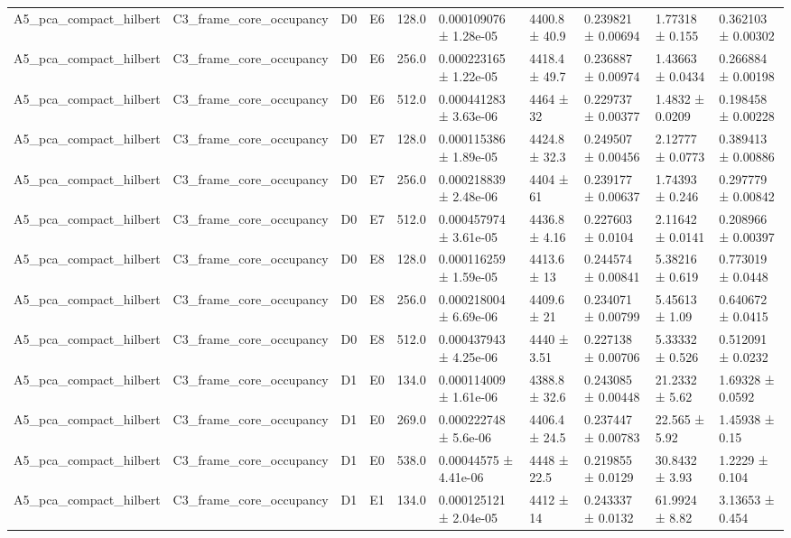 \begin{table}
\begin{tabular}{llllllllll}
A5\_pca\_compact\_hilbert & C3\_frame\_core\_occupancy & D0 & E6 & 128.0 & 0.000109076 ± 1.28e-05 & 4400.8 ± 40.9 & 0.239821 ± 0.00694 & 1.77318 ± 0.155 & 0.362103 ± 0.00302 \\
A5\_pca\_compact\_hilbert & C3\_frame\_core\_occupancy & D0 & E6 & 256.0 & 0.000223165 ± 1.22e-05 & 4418.4 ± 49.7 & 0.236887 ± 0.00974 & 1.43663 ± 0.0434 & 0.266884 ± 0.00198 \\
A5\_pca\_compact\_hilbert & C3\_frame\_core\_occupancy & D0 & E6 & 512.0 & 0.000441283 ± 3.63e-06 & 4464 ± 32 & 0.229737 ± 0.00377 & 1.4832 ± 0.0209 & 0.198458 ± 0.00228 \\
A5\_pca\_compact\_hilbert & C3\_frame\_core\_occupancy & D0 & E7 & 128.0 & 0.000115386 ± 1.89e-05 & 4424.8 ± 32.3 & 0.249507 ± 0.00456 & 2.12777 ± 0.0773 & 0.389413 ± 0.00886 \\
A5\_pca\_compact\_hilbert & C3\_frame\_core\_occupancy & D0 & E7 & 256.0 & 0.000218839 ± 2.48e-06 & 4404 ± 61 & 0.239177 ± 0.00637 & 1.74393 ± 0.246 & 0.297779 ± 0.00842 \\
A5\_pca\_compact\_hilbert & C3\_frame\_core\_occupancy & D0 & E7 & 512.0 & 0.000457974 ± 3.61e-05 & 4436.8 ± 4.16 & 0.227603 ± 0.0104 & 2.11642 ± 0.0141 & 0.208966 ± 0.00397 \\
A5\_pca\_compact\_hilbert & C3\_frame\_core\_occupancy & D0 & E8 & 128.0 & 0.000116259 ± 1.59e-05 & 4413.6 ± 13 & 0.244574 ± 0.00841 & 5.38216 ± 0.619 & 0.773019 ± 0.0448 \\
A5\_pca\_compact\_hilbert & C3\_frame\_core\_occupancy & D0 & E8 & 256.0 & 0.000218004 ± 6.69e-06 & 4409.6 ± 21 & 0.234071 ± 0.00799 & 5.45613 ± 1.09 & 0.640672 ± 0.0415 \\
A5\_pca\_compact\_hilbert & C3\_frame\_core\_occupancy & D0 & E8 & 512.0 & 0.000437943 ± 4.25e-06 & 4440 ± 3.51 & 0.227138 ± 0.00706 & 5.33332 ± 0.526 & 0.512091 ± 0.0232 \\
A5\_pca\_compact\_hilbert & C3\_frame\_core\_occupancy & D1 & E0 & 134.0 & 0.000114009 ± 1.61e-06 & 4388.8 ± 32.6 & 0.243085 ± 0.00448 & 21.2332 ± 5.62 & 1.69328 ± 0.0592 \\
A5\_pca\_compact\_hilbert & C3\_frame\_core\_occupancy & D1 & E0 & 269.0 & 0.000222748 ± 5.6e-06 & 4406.4 ± 24.5 & 0.237447 ± 0.00783 & 22.565 ± 5.92 & 1.45938 ± 0.15 \\
A5\_pca\_compact\_hilbert & C3\_frame\_core\_occupancy & D1 & E0 & 538.0 & 0.00044575 ± 4.41e-06 & 4448 ± 22.5 & 0.219855 ± 0.0129 & 30.8432 ± 3.93 & 1.2229 ± 0.104 \\
A5\_pca\_compact\_hilbert & C3\_frame\_core\_occupancy & D1 & E1 & 134.0 & 0.000125121 ± 2.04e-05 & 4412 ± 14 & 0.243337 ± 0.0132 & 61.9924 ± 8.82 & 3.13653 ± 0.454 \\

\end{tabular}
\end{table}
